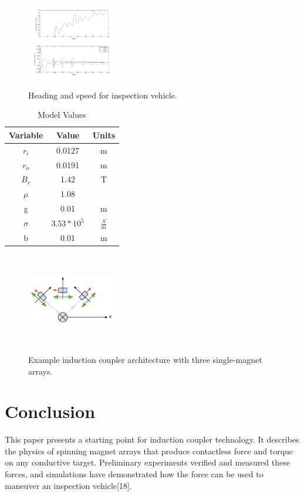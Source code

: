 \documentclass{article}
\begin{document}
\begin{figure}

\includegraphics[width = 4cm, height = 4cm ]{figures/theta_and_speed.png}
\caption{Heading and speed for inspection vehicle.}
\label{fig:theta_and_speeds}
\end{figure}



\begin{table}[ht]
\caption{Model Values} %
\centering %
\begin{tabular}{c c c} %
\hline\hline %
Variable & Value & Units\\ [0.5ex] %
\hline

$r_i$ & 0.0127 & m\\  
$r_o$ & 0.0191 & m \\
$B_r$ & 1.42 & T \\
$\mu$ & 1.08 & \\
g & 0.01 & m\\

$\sigma$ & $3.53 * 10^5$ & $\frac{S}{m}$ \\
b & 0.01 & m

 \\ [1ex] %
\hline %
\end{tabular}
\label{table:values} %
\end{table}


\begin{figure}
\includegraphics[width = 4cm, height = 4cm ]{figures/sample_coupler.png}
\label{fig:sample_coupler}
\caption{Example induction coupler architecture with three single-magnet arrays.}
\end{figure}\section{Conclusion}
This paper presents a starting point for induction coupler technology. It describes the physics of spinning magnet arrays that produce contactless force and torque on any conductive target. Preliminary experiments verified and measured these forces, and simulations have demonstrated how the force can be used to maneuver an inspection vehicle[18]. 
\end{document}
